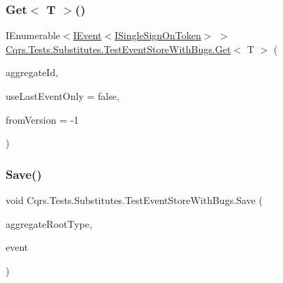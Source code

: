 \mbox{\label{classCqrs_1_1Tests_1_1Substitutes_1_1TestEventStoreWithBugs_a7b9ba57d07fa9ffc6d404d006e25c2b5}} 
\subsubsection{\texorpdfstring{Get$<$ T $>$()}{Get< T >()}}
{\footnotesize\ttfamily I\+Enumerable$<$\hyperlink{interfaceCqrs_1_1Events_1_1IEvent}{I\+Event}$<$\hyperlink{interfaceCqrs_1_1Authentication_1_1ISingleSignOnToken}{I\+Single\+Sign\+On\+Token}$>$ $>$ \hyperlink{classCqrs_1_1Tests_1_1Substitutes_1_1TestEventStoreWithBugs_af0ff73d3f8e8b28574ecef798d0be503}{Cqrs.\+Tests.\+Substitutes.\+Test\+Event\+Store\+With\+Bugs.\+Get}$<$ T $>$ (\begin{DoxyParamCaption}\item[{Guid}]{aggregate\+Id,  }\item[{bool}]{use\+Last\+Event\+Only = {\ttfamily false},  }\item[{int}]{from\+Version = {\ttfamily -\/1} }\end{DoxyParamCaption})}

\mbox{\label{classCqrs_1_1Tests_1_1Substitutes_1_1TestEventStoreWithBugs_ae2208808270f6f4b20856f04b5693f2c}} 
\subsubsection{\texorpdfstring{Save()}{Save()}}
{\footnotesize\ttfamily void Cqrs.\+Tests.\+Substitutes.\+Test\+Event\+Store\+With\+Bugs.\+Save (\begin{DoxyParamCaption}\item[{Type}]{aggregate\+Root\+Type,  }\item[{\hyperlink{interfaceCqrs_1_1Events_1_1IEvent}{I\+Event}$<$ \hyperlink{interfaceCqrs_1_1Authentication_1_1ISingleSignOnToken}{I\+Single\+Sign\+On\+Token} $>$ @}]{event }\end{DoxyParamCaption})}


